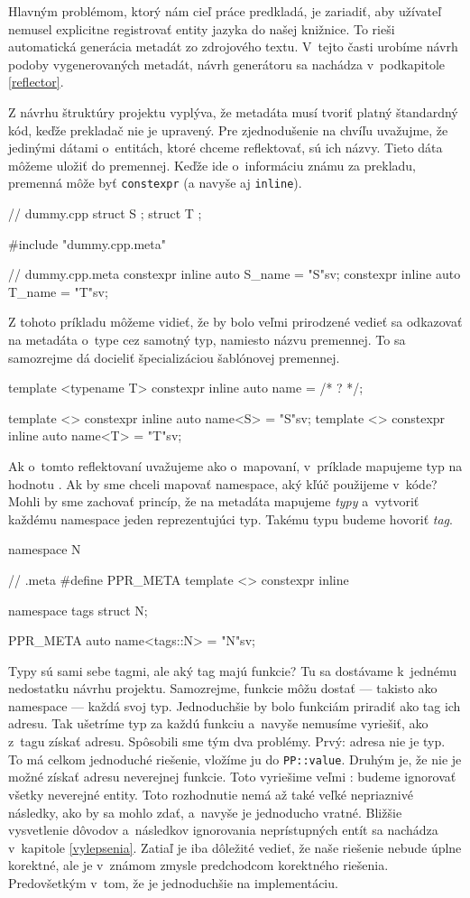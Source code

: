 Hlavným problémom, ktorý nám cieľ práce predkladá, je zariadiť, aby užívateľ nemusel explicitne registrovať entity jazyka do našej knižnice. To rieši automatická generácia metadát zo zdrojového textu. V~tejto časti urobíme návrh podoby vygenerovaných metadát, návrh generátoru sa nachádza v~podkapitole \ref{reflector}.

Z návrhu štruktúry projektu vyplýva, že metadáta musí tvoriť platný štandardný \Cpp{} kód, keďže prekladač nie je upravený. Pre zjednodušenie na chvíľu uvažujme, že jedinými dátami o~entitách, ktoré chceme reflektovať, sú ich názvy. Tieto dáta môžeme uložiť do premennej. Keďže ide o~informáciu známu za prekladu, premenná môže byť \texttt{constexpr} (a navyše aj \texttt{inline}).
\begin{code}
// dummy.cpp
struct S {};
struct T {};

#include "dummy.cpp.meta"

// dummy.cpp.meta
constexpr inline auto S_name = "S"sv;
constexpr inline auto T_name = "T"sv;
\end{code}
Z tohoto príkladu môžeme vidieť, že by bolo veľmi prirodzené vedieť sa odkazovať na metadáta o~type cez samotný typ, namiesto názvu premennej. To sa samozrejme dá docieliť špecializáciou šablónovej premennej.
\begin{code}
template <typename T> constexpr inline auto name = /* ? */;

template <> constexpr inline auto name<S> = "S"sv;
template <> constexpr inline auto name<T> = "T"sv;
\end{code}
Ak o~tomto reflektovaní uvažujeme ako o~mapovaní, v~príklade mapujeme typ na hodnotu . Ak by sme chceli mapovať namespace, aký kľúč použijeme v~kóde? Mohli by sme zachovať princíp, že na metadáta mapujeme \emph{typy} a~vytvoriť každému namespace jeden reprezentujúci typ. Takému typu budeme hovoriť \emph{tag}.
\begin{code}
namespace N {}

// .meta
#define PPR_META template <> constexpr inline

namespace tags { struct N; }

PPR_META auto name<tags::N> = "N"sv;
\end{code}

Typy sú sami sebe tagmi, ale aký tag majú funkcie? Tu sa dostávame k~jednému nedostatku návrhu projektu. Samozrejme, funkcie môžu dostať --- takisto ako namespace --- každá svoj typ. Jednoduchšie by bolo funkciám priradiť ako tag ich adresu. Tak ušetríme typ za každú funkciu a~navyše nemusíme vyriešiť, ako z~tagu získať adresu. Spôsobili sme tým dva problémy. Prvý: adresa nie je typ. To má celkom jednoduché riešenie, vložíme ju do \texttt{PP::value}. Druhým je, že nie je možné získať adresu neverejnej funkcie.  Toto vyriešime veľmi : budeme ignorovať všetky neverejné entity. Toto rozhodnutie nemá až také veľké nepriaznivé následky, ako by sa mohlo zdať, a~navyše je jednoducho vratné. Bližšie vysvetlenie dôvodov a~následkov ignorovania neprístupných entít sa nachádza v~kapitole \ref{vylepsenia}. Zatiaľ je iba dôležité vedieť, že naše riešenie nebude úplne korektné, ale je v~známom zmysle predchodcom korektného riešenia. Predovšetkým v~tom, že je jednoduchšie na implementáciu.

